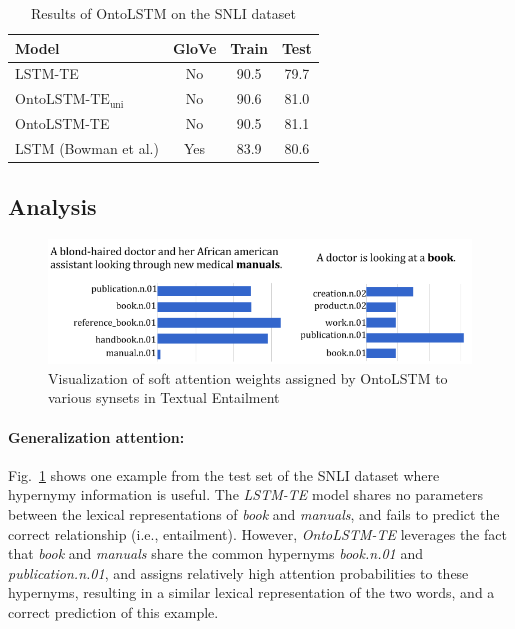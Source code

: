 \begin{table}
    \centering
    \begin{tabular}{lccc}
    \toprule
    \textbf{Model} & \textbf{GloVe} & \textbf{Train} & \textbf{Test}\\
    \midrule
    LSTM-TE                        & No & 90.5 & 79.7 \\
    $\text{OntoLSTM-TE}_\text{uni}$  & No & 90.6 & 81.0 \\
    OntoLSTM-TE  & No & 90.5 & 81.1 \\
    \midrule
    LSTM (Bowman et al.) & Yes & 83.9 & 80.6 \\
    \bottomrule
    \end{tabular}
    \caption{Results of OntoLSTM on the SNLI dataset}\label{tab:ontolstm_snli_results}
\end{table}


\subsection{Analysis}
\label{sec:ontolstm_snli_discussion}
\begin{figure}
\begin{center}
\includegraphics[width=5in]{figures/ontolstm_snli_comparison.png}
\caption{Visualization of soft attention weights assigned by OntoLSTM to various synsets in Textual Entailment}
\label{fig:ontolstm_snli_visualization}
\end{center}
\end{figure}

\paragraph{Generalization attention:} \label{sec:ontolstm_snli_generalization}
Fig.~\ref{fig:ontolstm_snli_visualization} shows one example from the test set of the 
SNLI dataset where hypernymy information is useful. 
The \textit{LSTM-TE} model shares no parameters between the lexical representations of 
\textit{book} and \textit{manuals}, and fails to predict the correct 
relationship (i.e., entailment). 
However, \textit{OntoLSTM-TE} leverages the fact that \textit{book} 
and \textit{manuals} share the common hypernyms \textit{book.n.01} and 
\textit{publication.n.01}, and assigns relatively high attention probabilities 
to these hypernyms, resulting in a similar lexical representation of the two 
words, and a correct prediction of this example.

